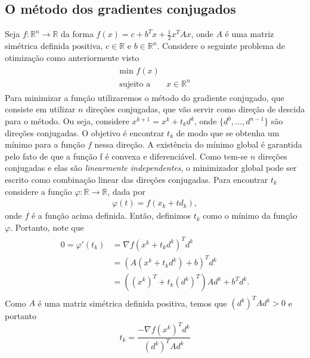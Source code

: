 \documentclass[
	12pt,				%
    oneside,			%
	a4paper,			%
	english,			%
	french,				%
	spanish,			%
	brazil,				%
	]{abntex2}
\begin{document}
        \subsection{O método dos gradientes conjugados}
        Seja $f:\mathbb{R}^n \to \mathbb{R}$ da forma $f(x) = c + b^{T}x + \frac{1}{2}x^{T}Ax$, onde $A$ é uma matriz simétrica definida positiva, $c \in \mathbb{R}$ e $b \in \mathbb{R}^n$. Considere o seguinte problema de otimização como anteriormente visto
        \begin{align*}
            \begin{split}
                \mbox{min } f(x) \\
                \mbox{sujeito a }& x \in \mathbb{R}^n
            \end{split}
        \end{align*}
        Para minimizar a função utilizaremos o método do gradiente conjugado, que consiste em utilizar $n$ direções conjugadas, que vão servir como direção de descida para o método. Ou seja, considere $x^{k+1} = x^k +t_{k}d^{k}$, onde $\{d^0,...,d^{n-1}\}$ são direções conjugadas. O objetivo é encontrar $t_k$ de modo que se obtenha um mínimo para a função $f$ nessa direção. A existência do mínimo global é garantida pelo fato de que a função f é convexa e diferenciável. %
        Como tem-se $n$ direções conjugadas e elas são \emph{linearmente independentes}, o minimizador global pode ser escrito como combinação linear das direções conjugadas.
        Para encontrar $t_k$ considere a função $\varphi: \mathbb{R} \to \mathbb{R}$, dada por
        \begin{gather*}
            \varphi(t) = f(x_k + td_k),
        \end{gather*}
        onde $f$ é a função acima definida. Então, definimos $t_k$ como o mínimo da função $\varphi$. Portanto, note que
        \begin{align*}
            \begin{split}
            0 = \varphi'(t_k) &= \nabla f(x^k + t_k d^k)^{T}d^k \\
            &= (A(x^k + t_k d^k) + b)^{T}d^k \\
            &= ((x^k)^{T} + t_k (d^{k})^{T})Ad^k + b^{T}d^k.
            \end{split}
        \end{align*}
        Como $A$ é uma matriz simétrica definida positiva, temos que $(d^k)^TAd^k > 0$ e portanto
        \begin{equation*}
            t_k = \frac{-\nabla f(x^k)^Td^k}{(d^k)^T A d^k}
        \end{equation*}
\end{document}
